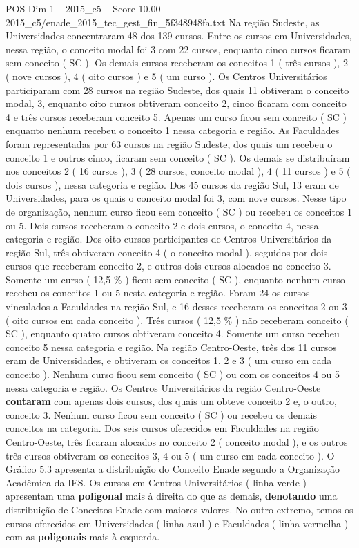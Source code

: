 \begin{textsample}{POS Dim 1 – 2015\_c5 – Score 10.00 – 2015\_c5/enade\_2015\_tec\_gest\_fin\_5f348948fa.txt}
Na região Sudeste, as Universidades concentraram 48 dos 139 cursos.
Entre os cursos em Universidades, nessa região, o conceito modal foi 3 com 22 cursos, enquanto cinco cursos ficaram sem conceito ( SC ).
Os demais cursos receberam os conceitos 1 ( três cursos ), 2 ( nove cursos ), 4 ( oito cursos ) e 5 ( um curso ).
Os Centros Universitários participaram com 28 cursos na região Sudeste, dos quais 11 obtiveram o conceito modal, 3, enquanto oito cursos obtiveram conceito 2, cinco ficaram com conceito 4 e três cursos receberam conceito 5.
Apenas um curso ficou sem conceito ( SC ) enquanto nenhum recebeu o conceito 1 nessa categoria e região.
As Faculdades foram representadas por 63 cursos na região Sudeste, dos quais um recebeu o conceito 1 e outros cinco, ficaram sem conceito ( SC ).
Os demais se distribuíram nos conceitos 2 ( 16 cursos ), 3 ( 28 cursos, conceito modal ), 4 ( 11 cursos ) e 5 ( dois cursos ), nessa categoria e região.
Dos 45 cursos da região Sul, 13 eram de Universidades, para os quais o conceito modal foi 3, com nove cursos.
Nesse tipo de organização, nenhum curso ficou sem conceito ( SC ) ou recebeu os conceitos 1 ou 5.
Dois cursos receberam o conceito 2 e dois cursos, o conceito 4, nessa categoria e região.
Dos oito cursos participantes de Centros Universitários da região Sul, três obtiveram conceito 4 ( o conceito modal ), seguidos por dois cursos que receberam conceito 2, e outros dois cursos alocados no conceito 3.
Somente um curso ( 12,5 \% ) ficou sem conceito ( SC ), enquanto nenhum curso recebeu os conceitos 1 ou 5 nesta categoria e região.
Foram 24 os cursos vinculados a Faculdades na região Sul, e 16 desses receberam os conceitos 2 ou 3 ( oito cursos em cada conceito ).
Três cursos ( 12,5 \% ) não receberam conceito ( SC ), enquanto quatro cursos obtiveram conceito 4.
Somente um curso recebeu conceito 5 nessa categoria e região.
Na região Centro-Oeste, três dos 11 cursos eram de Universidades, e obtiveram os conceitos 1, 2 e 3 ( um curso em cada conceito ).
Nenhum curso ficou sem conceito ( SC ) ou com os conceitos 4 ou 5 nessa categoria e região.
Os Centros Universitários da região Centro-Oeste \textbf{contaram} com apenas dois cursos, dos quais um obteve conceito 2 e, o outro, conceito 3.
Nenhum curso ficou sem conceito ( SC ) ou recebeu os demais conceitos na categoria.
Dos seis cursos oferecidos em Faculdades na região Centro-Oeste, três ficaram alocados no conceito 2 ( conceito modal ), e os outros três cursos obtiveram os conceitos 3, 4 ou 5 ( um curso em cada conceito ).
O Gráfico 5.3 apresenta a distribuição do Conceito Enade segundo a Organização Acadêmica da IES.
Os cursos em Centros Universitários ( linha verde ) apresentam uma \textbf{poligonal} mais à direita do que as demais, \textbf{denotando} uma distribuição de Conceitos Enade com maiores valores.
No outro extremo, temos os cursos oferecidos em Universidades ( linha azul ) e Faculdades ( linha vermelha ) com as \textbf{poligonais} mais à esquerda.

\end{textsample}
